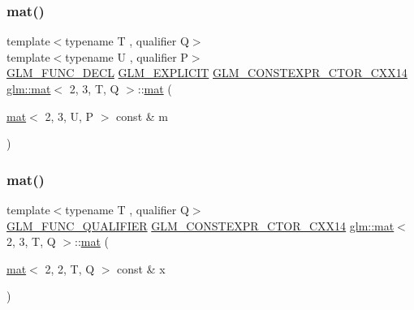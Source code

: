 \mbox{\label{structglm_1_1mat_3_012_00_013_00_01_t_00_01_q_01_4_a1c561950eeef2c86735f4c6a65a8f1d8}} 
\subsubsection{\texorpdfstring{mat()}{mat()}\hspace{0.1cm}{\footnotesize\ttfamily [9/21]}}
{\footnotesize\ttfamily template$<$typename T , qualifier Q$>$ \\
template$<$typename U , qualifier P$>$ \\
\mbox{\hyperlink{setup_8hpp_ab2d052de21a70539923e9bcbf6e83a51}{G\+L\+M\+\_\+\+F\+U\+N\+C\+\_\+\+D\+E\+CL}} \mbox{\hyperlink{setup_8hpp_a6c74f5a5e7b134ab69023ff9a30d4d5d}{G\+L\+M\+\_\+\+E\+X\+P\+L\+I\+C\+IT}} \mbox{\hyperlink{setup_8hpp_a0900f9145e68bf6061b6f5e7be3fa751}{G\+L\+M\+\_\+\+C\+O\+N\+S\+T\+E\+X\+P\+R\+\_\+\+C\+T\+O\+R\+\_\+\+C\+X\+X14}} \mbox{\hyperlink{structglm_1_1mat}{glm\+::mat}}$<$ 2, 3, T, Q $>$\+::\mbox{\hyperlink{structglm_1_1mat}{mat}} (\begin{DoxyParamCaption}\item[{\mbox{\hyperlink{structglm_1_1mat}{mat}}$<$ 2, 3, U, P $>$ const \&}]{m }\end{DoxyParamCaption})}

\mbox{\label{structglm_1_1mat_3_012_00_013_00_01_t_00_01_q_01_4_a66345b384cd179e59bb2f137736bc228}} 
\subsubsection{\texorpdfstring{mat()}{mat()}\hspace{0.1cm}{\footnotesize\ttfamily [10/21]}}
{\footnotesize\ttfamily template$<$typename T , qualifier Q$>$ \\
\mbox{\hyperlink{setup_8hpp_a33fdea6f91c5f834105f7415e2a64407}{G\+L\+M\+\_\+\+F\+U\+N\+C\+\_\+\+Q\+U\+A\+L\+I\+F\+I\+ER}} \mbox{\hyperlink{setup_8hpp_a0900f9145e68bf6061b6f5e7be3fa751}{G\+L\+M\+\_\+\+C\+O\+N\+S\+T\+E\+X\+P\+R\+\_\+\+C\+T\+O\+R\+\_\+\+C\+X\+X14}} \mbox{\hyperlink{structglm_1_1mat}{glm\+::mat}}$<$ 2, 3, T, Q $>$\+::\mbox{\hyperlink{structglm_1_1mat}{mat}} (\begin{DoxyParamCaption}\item[{\mbox{\hyperlink{structglm_1_1mat}{mat}}$<$ 2, 2, T, Q $>$ const \&}]{x }\end{DoxyParamCaption})}

